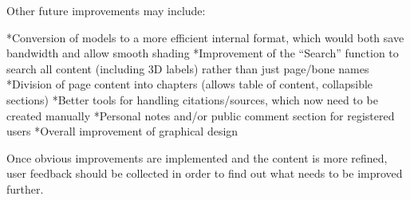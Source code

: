 Other future improvements may include:

\begitems
*Conversion of models to a more efficient internal format, which would both save bandwidth and allow smooth shading
*Improvement of the “Search” function to search all content (including 3D labels) rather than just page/bone names
*Division of page content into chapters (allows table of content, collapsible sections)
*Better tools for handling citations/sources, which now need to be created manually
*Personal notes and/or public comment section for registered users
*Overall improvement of graphical design
\enditems

Once obvious improvements are implemented and the content is more refined, user feedback should be collected in order to find out what needs to be improved further.
